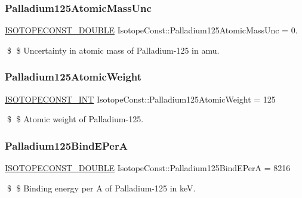 \subsubsection{\texorpdfstring{Palladium125\+Atomic\+Mass\+Unc}{Palladium125AtomicMassUnc}}
{\footnotesize\ttfamily \mbox{\hyperlink{group___isotope_const-_macros_ga8f45a7272ce02c0b4c65c44636ed719a}{I\+S\+O\+T\+O\+P\+E\+C\+O\+N\+S\+T\+\_\+\+D\+O\+U\+B\+LE}} Isotope\+Const\+::\+Palladium125\+Atomic\+Mass\+Unc = 0.}

\$ \$ Uncertainty in atomic mass of Palladium-\/125 in amu. \mbox{\label{group___isotope_const-_palladium-_pd125_ga67b3a738df5dddc17d3b298956b3c81e}} 
\subsubsection{\texorpdfstring{Palladium125\+Atomic\+Weight}{Palladium125AtomicWeight}}
{\footnotesize\ttfamily \mbox{\hyperlink{group___isotope_const-_macros_ga5f18360b3e99483a35c32d789e62621c}{I\+S\+O\+T\+O\+P\+E\+C\+O\+N\+S\+T\+\_\+\+I\+NT}} Isotope\+Const\+::\+Palladium125\+Atomic\+Weight = 125}

\$ \$ Atomic weight of Palladium-\/125. \mbox{\label{group___isotope_const-_palladium-_pd125_ga8ec6737f067aa413d32d4557ff9b278f}} 
\subsubsection{\texorpdfstring{Palladium125\+Bind\+E\+PerA}{Palladium125BindEPerA}}
{\footnotesize\ttfamily \mbox{\hyperlink{group___isotope_const-_macros_ga8f45a7272ce02c0b4c65c44636ed719a}{I\+S\+O\+T\+O\+P\+E\+C\+O\+N\+S\+T\+\_\+\+D\+O\+U\+B\+LE}} Isotope\+Const\+::\+Palladium125\+Bind\+E\+PerA = 8216}

\$ \$ Binding energy per A of Palladium-\/125 in keV. \mbox{\label{group___isotope_const-_palladium-_pd125_gaa8b10cba3e709a45232ab31bf845c51d}} 
